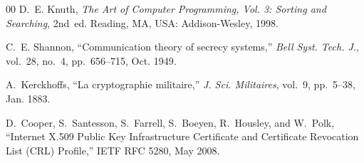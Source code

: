\documentclass[conference]{IEEEtran}
\begin{document}
\begin{thebibliography}{00}
D.~E. Knuth, \emph{The Art of Computer Programming, Vol. 3: Sorting and Searching}, 2nd~ed. Reading, MA, USA: Addison-Wesley, 1998.

C.~E. Shannon, ``Communication theory of secrecy systems,'' \emph{Bell Syst. Tech. J.}, vol.~28, no.~4, pp.~656--715, Oct. 1949.

A.~Kerckhoffs, ``La cryptographie militaire,'' \emph{J. Sci. Militaires}, vol.~9, pp.~5--38, Jan. 1883.

D.~Cooper, S.~Santesson, S.~Farrell, S.~Boeyen, R.~Housley, and W.~Polk, ``Internet X.509 Public Key Infrastructure Certificate and Certificate Revocation List (CRL) Profile,'' IETF RFC 5280, May 2008.

\end{thebibliography}
\end{document}
